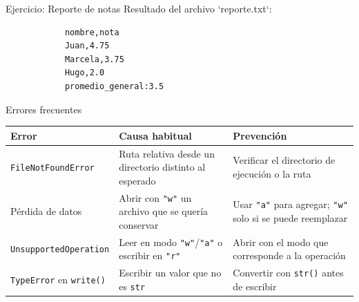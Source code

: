 \documentclass{beamer}
\begin{document}
    \begin{frame}[fragile, t]{Ejercicio: Reporte de notas}
        Resultado del archivo `reporte.txt`:
        \begin{verbatim}
            nombre,nota
            Juan,4.75
            Marcela,3.75
            Hugo,2.0
            promedio_general:3.5
        \end{verbatim}
    \end{frame}

    \begin{frame}[fragile, t]{Errores frecuentes}
        \renewcommand{\arraystretch}{1.25}
        \begin{center}
            \scriptsize
            \begin{tabular}{@{}p{2.6cm}p{3.6cm}p{4.2cm}@{}}
                \toprule
                \textbf{Error} & \textbf{Causa habitual} & \textbf{Prevención} \\
                \midrule
                \texttt{FileNotFoundError} &
                Ruta relativa desde un directorio distinto al esperado &
                Verificar el directorio de ejecución o la ruta \\
                Pérdida de datos &
                Abrir con \texttt{"w"} un archivo que se quería conservar &
                Usar \texttt{"a"} para agregar; \texttt{"w"} solo si se puede reemplazar \\
                \texttt{UnsupportedOperation} &
                Leer en modo \texttt{"w"}/\texttt{"a"} o escribir en \texttt{"r"} &
                Abrir con el modo que corresponde a la operación \\
                \texttt{TypeError} en \texttt{write()} &
                Escribir un valor que no es \texttt{str} &
                Convertir con \texttt{str()} antes de escribir \\
                \bottomrule
            \end{tabular}
        \end{center}
    \end{frame}
\end{document}
